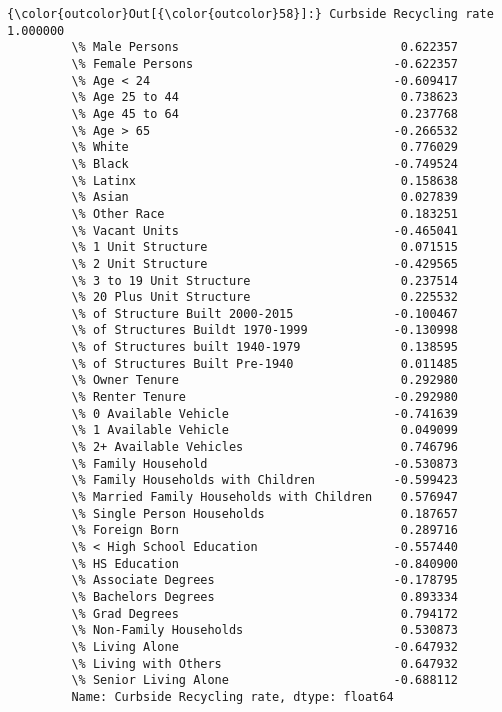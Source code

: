 \documentclass[11pt]{article}
\begin{document}
\begin{Verbatim}[commandchars=\\\{\}]
{\color{outcolor}Out[{\color{outcolor}58}]:} Curbside Recycling rate                      1.000000
         \% Male Persons                               0.622357
         \% Female Persons                            -0.622357
         \% Age < 24                                  -0.609417
         \% Age 25 to 44                               0.738623
         \% Age 45 to 64                               0.237768
         \% Age > 65                                  -0.266532
         \% White                                      0.776029
         \% Black                                     -0.749524
         \% Latinx                                     0.158638
         \% Asian                                      0.027839
         \% Other Race                                 0.183251
         \% Vacant Units                              -0.465041
         \% 1 Unit Structure                           0.071515
         \% 2 Unit Structure                          -0.429565
         \% 3 to 19 Unit Structure                     0.237514
         \% 20 Plus Unit Structure                     0.225532
         \% of Structure Built 2000-2015              -0.100467
         \% of Structures Buildt 1970-1999            -0.130998
         \% of Structures built 1940-1979              0.138595
         \% of Structures Built Pre-1940               0.011485
         \% Owner Tenure                               0.292980
         \% Renter Tenure                             -0.292980
         \% 0 Available Vehicle                       -0.741639
         \% 1 Available Vehicle                        0.049099
         \% 2+ Available Vehicles                      0.746796
         \% Family Household                          -0.530873
         \% Family Households with Children           -0.599423
         \% Married Family Households with Children    0.576947
         \% Single Person Households                   0.187657
         \% Foreign Born                               0.289716
         \% < High School Education                   -0.557440
         \% HS Education                              -0.840900
         \% Associate Degrees                         -0.178795
         \% Bachelors Degrees                          0.893334
         \% Grad Degrees                               0.794172
         \% Non-Family Households                      0.530873
         \% Living Alone                              -0.647932
         \% Living with Others                         0.647932
         \% Senior Living Alone                       -0.688112
         Name: Curbside Recycling rate, dtype: float64
\end{Verbatim}
            
\end{document}
